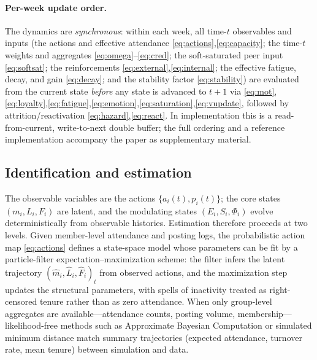 \documentclass[11pt]{article}
\begin{document}
\paragraph{Per-week update order.}
The dynamics are \emph{synchronous}: within each week, all time-$t$ observables and inputs (the actions and effective attendance \eqref{eq:actions},\eqref{eq:capacity}; the time-$t$ weights and aggregates \eqref{eq:omega}--\eqref{eq:cred}; the soft-saturated peer input \eqref{eq:softsat}; the reinforcements \eqref{eq:external},\eqref{eq:internal}; the effective fatigue, decay, and gain \eqref{eq:decay}; and the stability factor \eqref{eq:stability}) are evaluated from the current state \emph{before} any state is advanced to $t{+}1$ via \eqref{eq:mot},\eqref{eq:loyalty},\eqref{eq:fatigue},\eqref{eq:emotion},\eqref{eq:saturation},\eqref{eq:vupdate}, followed by attrition/reactivation \eqref{eq:hazard},\eqref{eq:react}. In implementation this is a read-from-current, write-to-next double buffer; the full ordering and a reference implementation accompany the paper as supplementary material.

\subsection{Identification and estimation}\label{sec:estimation}
The observable variables are the actions $\{a_i(t),p_i(t)\}$; the core states $(m_i,L_i,F_i)$ are latent, and the modulating states $(E_i,S_i,\Phi_i)$ evolve deterministically from observable histories. Estimation therefore proceeds at two levels. Given member-level attendance and posting logs, the probabilistic action map \eqref{eq:actions} defines a state-space model whose parameters can be fit by a particle-filter expectation--maximization scheme: the filter infers the latent trajectory $(\hat m_i,\hat L_i,\hat F_i)_t$ from observed actions, and the maximization step updates the structural parameters, with spells of inactivity treated as right-censored tenure rather than as zero attendance. When only group-level aggregates are available---attendance counts, posting volume, membership---likelihood-free methods such as Approximate Bayesian Computation or simulated minimum distance match summary trajectories (expected attendance, turnover rate, mean tenure) between simulation and data.
\end{document}
